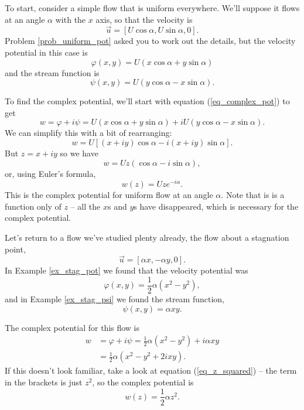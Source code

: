 \begin{example}
To start, consider a simple flow that is uniform everywhere.  We'll suppose it flows at an angle $\alpha$ with the $x$ axis, so that the velocity is
\begin{equation}
\vec{u} = [U\cos \alpha, U\sin \alpha, 0].
\end{equation}
Problem \ref{prob_uniform_pot} asked you to work out the details, but the velocity potential in this case is
\begin{equation}
\varphi (x, y) = U(x \cos\alpha + y\sin\alpha)
\end{equation}
and the stream function is
\begin{equation}
\psi (x, y) = U(y \cos\alpha - x\sin\alpha).
\end{equation}

To find the complex potential, we'll start with equation (\ref{eq_complex_pot}) to get
\[
w = \varphi + i\psi = U(x \cos\alpha + y\sin\alpha) + iU(y \cos\alpha - x\sin\alpha).
\]
We can simplify this with a bit of rearranging:
\[
w = U \left[ (x+iy) \cos\alpha - i(x+iy) \sin\alpha \right].
\]
But $z = x+iy$ so we have
\[
w = Uz(\cos\alpha - i\sin\alpha),
\]
or, using Euler's formula,
\begin{equation}
w(z) = Uze^{-i\alpha}.
\end{equation}
This is the complex potential for uniform flow at an angle $\alpha$.  Note that is is a function only of $z$ -- all the $x$s and $y$s have disappeared, which is necessary for the complex potential.
\end{example}

\begin{example}
Let's return to a flow we've studied plenty already, the flow about a stagnation point,
\[
\vec{u} = [\alpha x, -\alpha y, 0].
\]
In Example \ref{ex_stag_pot} we found that the velocity potential was
\[
\varphi (x, y) = \frac{1}{2} \alpha (x^2 - y^2),
\]
and in Example \ref{ex_stag_psi} we found the stream function,
\[
\psi(x, y) = \alpha xy.
\]

The complex potential for this flow is
\[
\begin{split}
w & = \varphi + i\psi = \frac{1}{2} \alpha (x^2 - y^2) + i\alpha xy \\
& = \frac{1}{2} \alpha ( x^2 - y^2 + 2ixy ).
\end{split}
\]
If this doesn't look familiar, take a look at equation (\ref{eq_z_squared}) -- the term in the brackets is just $z^2$, so the complex potential is
\begin{equation}
w(z) = \frac{1}{2} \alpha z^2.
\end{equation}

\end{example}


